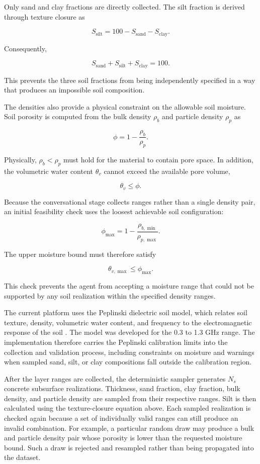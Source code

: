 \documentclass[journal]{IEEEtran}
\begin{document}
Only sand and clay fractions are directly collected. The silt fraction is derived through texture closure as

$$
S_{\mathrm{silt}}
=
100 -
S_{\mathrm{sand}} -
S_{\mathrm{clay}}.
$$

Consequently,

$$
S_{\mathrm{sand}}
+
S_{\mathrm{silt}}
+
S_{\mathrm{clay}}
=
100.
$$

This prevents the three soil fractions from being independently specified in a way that produces an impossible soil composition.

The densities also provide a physical constraint on the allowable soil moisture. Soil porosity is computed from the bulk density \(\rho_b\) and particle density \(\rho_p\) as

$$
\phi = 1-\frac{\rho_b}{\rho_p}.
$$

Physically, \(\rho_b < \rho_p\) must hold for the material to contain pore space. In addition, the volumetric water content \(\theta_v\) cannot exceed the available pore volume,

$$
\theta_v \leq \phi.
$$

Because the conversational stage collects ranges rather than a single density pair, an initial feasibility check uses the loosest achievable soil configuration:

$$
\phi_{\max}
=
1-
\frac{\rho_{b,\min}}
{\rho_{p,\max}}.
$$

The upper moisture bound must therefore satisfy

$$
\theta_{v,\max} \leq \phi_{\max}.
$$

This check prevents the agent from accepting a moisture range that could not be supported by any soil realization within the specified density ranges.

The current platform uses the Peplinski dielectric soil model, which relates soil texture, density, volumetric water content, and frequency to the electromagnetic response of the soil \cite{peplinski1995dielectric}. The model was developed for the 0.3 to 1.3 GHz range. The implementation therefore carries the Peplinski calibration limits into the collection and validation process, including constraints on moisture and warnings when sampled sand, silt, or clay compositions fall outside the calibration region.

After the layer ranges are collected, the deterministic sampler generates \(N_s\) concrete subsurface realizations. Thickness, sand fraction, clay fraction, bulk density, and particle density are sampled from their respective ranges. Silt is then calculated using the texture-closure equation above. Each sampled realization is checked again because a set of individually valid ranges can still produce an invalid combination. For example, a particular random draw may produce a bulk and particle density pair whose porosity is lower than the requested moisture bound. Such a draw is rejected and resampled rather than being propagated into the dataset.
\end{document}
